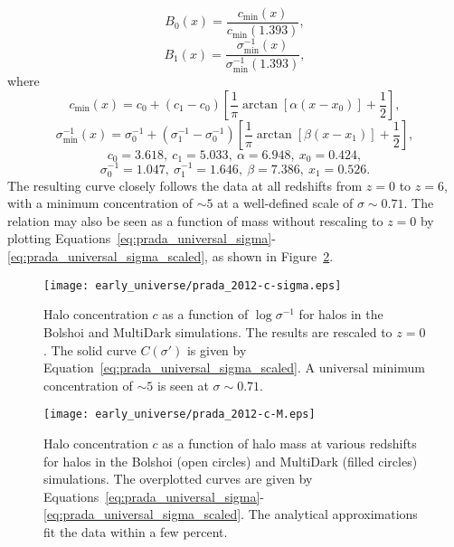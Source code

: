\begin{equation}
	B_{0}(x) = \frac{c_{\min}(x)}{c_{\min}(1.393)},
\end{equation}
\begin{equation}
	B_{1}(x) = \frac{\sigma^{-1}_{\min}(x)}{\sigma^{-1}_{\min}(1.393)},
\end{equation}
where
\begin{equation}
	c_{\min}(x) = c_{0} + (c_{1} - c_{0}) \left[ \frac{1}{\pi} \arctan[\alpha(x - x_{0})] + \frac{1}{2} \right],
\end{equation}
\begin{equation}
	\sigma^{-1}_{\min}(x) = \sigma^{-1}_{0} + (\sigma^{-1}_{1} - \sigma^{-1}_{0}) \left[ \frac{1}{\pi} \arctan[\beta(x - x_{1})] + \frac{1}{2} \right],
\end{equation}
\begin{equation}
	c_{0} = 3.618,\ c_{1} = 5.033,\ \alpha = 6.948,\ x_{0} = 0.424,
\end{equation}
\begin{equation}
	\sigma^{-1}_{0} = 1.047,\ \sigma^{-1}_{1} = 1.646,\ \beta = 7.386,\ x_{1} = 0.526.
\end{equation}
The resulting curve closely follows the data at all redshifts from $z = 0$ to $z = 6$, with a minimum concentration of $\sim 5$ at a well-defined scale of $\sigma \sim 0.71$.  The relation may also be seen as a function of mass without rescaling to $z = 0$ by plotting Equations~\ref{eq:prada_universal_sigma}-\ref{eq:prada_universal_sigma_scaled}, as shown in Figure~\ref{fig:concentration--prada_c_M}.

\begin{figure}[ht]
	\centering
	\texttt{[image: early\_universe/prada\_2012-c-sigma.eps]}
	\caption[Halo concentration $c$ as a function of $\log \sigma^{-1}$]{\footnotesize Halo concentration $c$ as a function of $\log \sigma^{-1}$ for halos in the Bolshoi and MultiDark simulations.  The results are rescaled to $z = 0$.  The solid curve $C(\sigma')$ is given by Equation~\ref{eq:prada_universal_sigma_scaled}.  A universal minimum concentration of $\sim 5$ is seen at $\sigma \sim 0.71$.  \citep{2012MNRAS.423.3018P}}
	\label{fig:concentration--prada_c_sigma}
\end{figure}

\begin{figure}[ht]
	\centering
	\texttt{[image: early\_universe/prada\_2012-c-M.eps]}
	\caption[Halo concentration $c$ as a function of halo mass]{\footnotesize Halo concentration $c$ as a function of halo mass at various redshifts for halos in the Bolshoi (open circles) and MultiDark (filled circles) simulations.  The overplotted curves are given by Equations~\ref{eq:prada_universal_sigma}-\ref{eq:prada_universal_sigma_scaled}.  The analytical approximations fit the data within a few percent.  \citep{2012MNRAS.423.3018P}}
	\label{fig:concentration--prada_c_M}
\end{figure}




